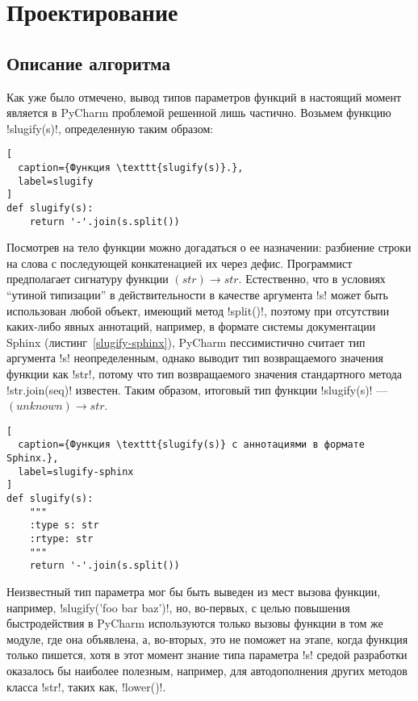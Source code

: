 \chapter{Проектирование}
\label{sec:designing}

\section{Описание алгоритма}

Как уже было отмечено, вывод типов параметров функций в настоящий момент
является в PyCharm проблемой решенной лишь частично. Возьмем функцию
!slugify(s)!, определенную таким образом:

\begin{lstlisting}[
  caption={Функция \texttt{slugify(s)}.},
  label=slugify
]
def slugify(s):
    return '-'.join(s.split())
\end{lstlisting}

Посмотрев на тело функции можно догадаться о ее назначении: разбиение строки на
слова с последующей конкатенацией их через дефис. Программист предполагает
сигнатуру функции $(str) \rightarrow str$. Естественно, что в условиях ``утиной
типизации'' в действительности в качестве аргумента !s! может быть использован любой
объект, имеющий метод !split()!, поэтому при отсутствии каких-либо явных
аннотаций, например, в формате системы документации Sphinx
(листинг~\ref{slugify-sphinx}), PyCharm пессимистично считает тип аргумента !s!
неопределенным, однако выводит тип возвращаемого значения функции как !str!,
потому что тип возвращаемого значения стандартного метода !str.join(seq)!
известен. Таким образом, итоговый тип функции !slugify(s)! --- $(unknown)
\rightarrow str$.

\begin{lstlisting}[
  caption={Функция \texttt{slugify(s)} c аннотациями в формате Sphinx.},
  label=slugify-sphinx
]
def slugify(s):
    """
    :type s: str
    :rtype: str
    """
    return '-'.join(s.split())
\end{lstlisting}

Неизвестный тип параметра мог бы быть выведен из мест вызова функции, например, 
!slugify('foo bar baz')!, но, во-первых, с целью повышения быстродействия в
PyCharm используются только вызовы функции в том же модуле, где она объявлена,
а, во-вторых, это не поможет на этапе, когда функция только пишется, хотя
в этот момент знание типа параметра !s! средой разработки оказалось бы наиболее
полезным, например, для автодополнения других методов класса !str!, таких как,
!lower()!.

